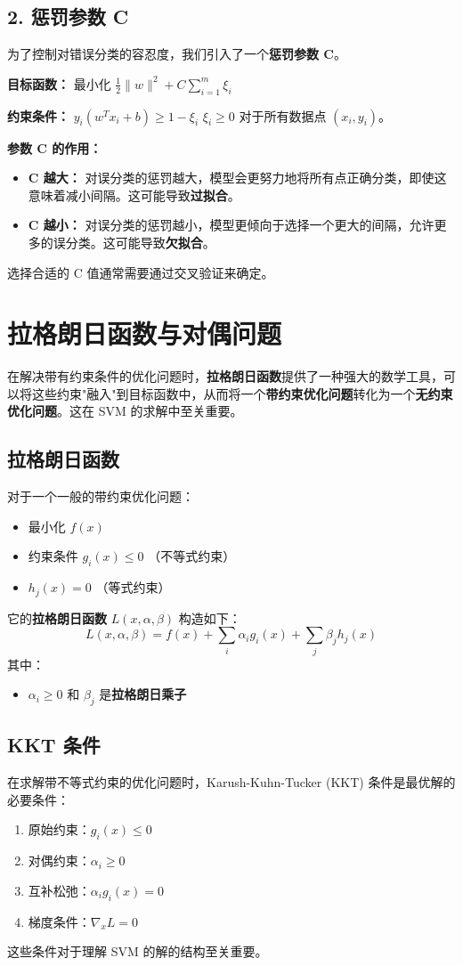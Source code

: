 \documentclass{article}
\begin{document}
\subsection*{2. 惩罚参数 C}
为了控制对错误分类的容忍度，我们引入了一个\textbf{惩罚参数 C}。

\textbf{目标函数：}
最小化 $\frac{1}{2} \|w\|^2 + C \sum_{i=1}^{m} \xi_i$

\textbf{约束条件：}
$y_i (w^T x_i + b) \ge 1 - \xi_i$
$\xi_i \ge 0$
对于所有数据点 $(x_i, y_i)$。

\textbf{参数 C 的作用：}
\begin{itemize}
    \item \textbf{C 越大：} 对误分类的惩罚越大，模型会更努力地将所有点正确分类，即使这意味着减小间隔。这可能导致\textbf{过拟合}。
    \item \textbf{C 越小：} 对误分类的惩罚越小，模型更倾向于选择一个更大的间隔，允许更多的误分类。这可能导致\textbf{欠拟合}。
\end{itemize}
选择合适的 C 值通常需要通过交叉验证来确定。



\section*{拉格朗日函数与对偶问题}
在解决带有约束条件的优化问题时，\textbf{拉格朗日函数}提供了一种强大的数学工具，可以将这些约束"融入"到目标函数中，从而将一个\textbf{带约束优化问题}转化为一个\textbf{无约束优化问题}。这在 SVM 的求解中至关重要。

\subsection*{拉格朗日函数}
对于一个一般的带约束优化问题：
\begin{itemize}
    \item 最小化 $f(x)$
    \item 约束条件 $g_i(x) \le 0$ （不等式约束）
    \item $h_j(x) = 0$ （等式约束）
\end{itemize}
它的\textbf{拉格朗日函数} $L(x, \alpha, \beta)$ 构造如下：
$$L(x, \alpha, \beta) = f(x) + \sum_i \alpha_i g_i(x) + \sum_j \beta_j h_j(x)$$
其中：
\begin{itemize}
    \item $\alpha_i \ge 0$ 和 $\beta_j$ 是\textbf{拉格朗日乘子}
\end{itemize}

\subsection*{KKT 条件} %
在求解带不等式约束的优化问题时，Karush-Kuhn-Tucker (KKT) 条件是最优解的必要条件：
\begin{enumerate}
    \item 原始约束：$g_i(x) \le 0$
    \item 对偶约束：$\alpha_i \ge 0$
    \item 互补松弛：$\alpha_i g_i(x) = 0$
    \item 梯度条件：$\nabla_x L = 0$
\end{enumerate}
这些条件对于理解 SVM 的解的结构至关重要。
\end{document}
